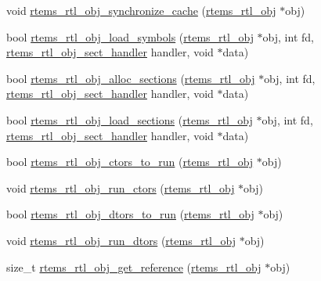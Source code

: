\begin{DoxyCompactItemize}
\item 
void \mbox{\hyperlink{rtl-obj_8c_a98c2a1b1a67add778c0b4017976f91c3}{rtems\+\_\+rtl\+\_\+obj\+\_\+synchronize\+\_\+cache}} (\mbox{\hyperlink{structrtems__rtl__obj}{rtems\+\_\+rtl\+\_\+obj}} $\ast$obj)
\item 
bool \mbox{\hyperlink{rtl-obj_8c_acdf565c078750f3114d8fd5ead341cdf}{rtems\+\_\+rtl\+\_\+obj\+\_\+load\+\_\+symbols}} (\mbox{\hyperlink{structrtems__rtl__obj}{rtems\+\_\+rtl\+\_\+obj}} $\ast$obj, int fd, \mbox{\hyperlink{rtl-obj_8h_a7af5827cf336da33eef4564a6e00ba11}{rtems\+\_\+rtl\+\_\+obj\+\_\+sect\+\_\+handler}} handler, void $\ast$data)
\item 
bool \mbox{\hyperlink{rtl-obj_8c_abfecc46708adb154ec1a87f1fcc97662}{rtems\+\_\+rtl\+\_\+obj\+\_\+alloc\+\_\+sections}} (\mbox{\hyperlink{structrtems__rtl__obj}{rtems\+\_\+rtl\+\_\+obj}} $\ast$obj, int fd, \mbox{\hyperlink{rtl-obj_8h_a7af5827cf336da33eef4564a6e00ba11}{rtems\+\_\+rtl\+\_\+obj\+\_\+sect\+\_\+handler}} handler, void $\ast$data)
\item 
bool \mbox{\hyperlink{rtl-obj_8c_aac7c6817d06d317f301538bcf30ffa9f}{rtems\+\_\+rtl\+\_\+obj\+\_\+load\+\_\+sections}} (\mbox{\hyperlink{structrtems__rtl__obj}{rtems\+\_\+rtl\+\_\+obj}} $\ast$obj, int fd, \mbox{\hyperlink{rtl-obj_8h_a7af5827cf336da33eef4564a6e00ba11}{rtems\+\_\+rtl\+\_\+obj\+\_\+sect\+\_\+handler}} handler, void $\ast$data)
\item 
bool \mbox{\hyperlink{rtl-obj_8c_a1d4c73beba22bae24a66704baa5a8e5a}{rtems\+\_\+rtl\+\_\+obj\+\_\+ctors\+\_\+to\+\_\+run}} (\mbox{\hyperlink{structrtems__rtl__obj}{rtems\+\_\+rtl\+\_\+obj}} $\ast$obj)
\item 
void \mbox{\hyperlink{rtl-obj_8c_ab61d5e574b2e115b9fa004bdd2619f23}{rtems\+\_\+rtl\+\_\+obj\+\_\+run\+\_\+ctors}} (\mbox{\hyperlink{structrtems__rtl__obj}{rtems\+\_\+rtl\+\_\+obj}} $\ast$obj)
\item 
bool \mbox{\hyperlink{rtl-obj_8c_ae2f95f4733d04acbb018f431340be2db}{rtems\+\_\+rtl\+\_\+obj\+\_\+dtors\+\_\+to\+\_\+run}} (\mbox{\hyperlink{structrtems__rtl__obj}{rtems\+\_\+rtl\+\_\+obj}} $\ast$obj)
\item 
void \mbox{\hyperlink{rtl-obj_8c_a4c2ee2202085fecf74954e175a0fb7e3}{rtems\+\_\+rtl\+\_\+obj\+\_\+run\+\_\+dtors}} (\mbox{\hyperlink{structrtems__rtl__obj}{rtems\+\_\+rtl\+\_\+obj}} $\ast$obj)
\item 
size\+\_\+t \mbox{\hyperlink{rtl-obj_8c_a1e3d355bd13971d7bc629cb890b261bf}{rtems\+\_\+rtl\+\_\+obj\+\_\+get\+\_\+reference}} (\mbox{\hyperlink{structrtems__rtl__obj}{rtems\+\_\+rtl\+\_\+obj}} $\ast$obj)

\end{DoxyCompactItemize}
